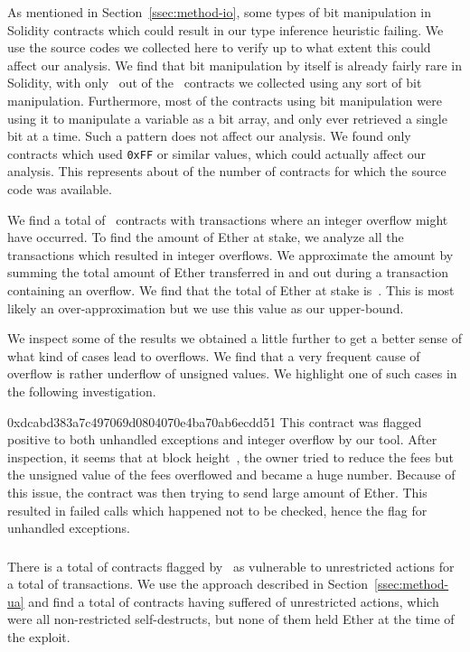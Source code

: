 As mentioned in Section~\ref{ssec:method-io}, some types of bit manipulation in Solidity contracts which could result in our type inference heuristic failing. We use the source codes we collected here to verify up to what extent this could affect our analysis. We find that bit manipulation by itself is already fairly rare in Solidity, with only~ out of the~ contracts we collected using any sort of bit manipulation. Furthermore, most of the contracts using bit manipulation were using it to manipulate a variable as a bit array, and only ever retrieved a single bit at a time. Such a pattern does not affect our analysis. We found only~ contracts which used \lstinline{0xFF} or similar values, which could actually affect our analysis. This represents about  of the number of contracts for which the source code was available.

We find a total of~ contracts with transactions where an integer overflow might have occurred.
To find the amount of Ether at stake, we analyze all the transactions which resulted in integer overflows. We approximate the amount by summing the total amount of Ether transferred in and out during a transaction containing an overflow. We find that the total of Ether at stake is~. This is most likely an over-approximation but we use this value as our upper-bound.

We inspect some of the results we obtained a little further to get a better sense of what kind of cases lead to overflows.
We find that a very frequent cause of overflow is rather underflow of unsigned values.
We highlight one of such cases in the following investigation.

\begin{investigation}{0xdcabd383a7c497069d0804070e4ba70ab6ecdd51}
This contract was flagged positive to both unhandled exceptions and integer overflow by our tool.
%
After inspection, it seems that at block height~, the owner tried to reduce the fees but the unsigned value of the fees overflowed and became a huge number. Because of this issue, the contract was then trying to send large amount of Ether. 
%
This resulted in failed calls which happened not to be checked, hence the flag for unhandled exceptions.
\end{investigation}

\subsubsection{\unrestrictedaction}
\label{ssec:analysis-ua}
There is a total of  contracts flagged by~\cite{Tsankov2018,Nikolic2018a,Krupp2018} as vulnerable to unrestricted actions for a total of  transactions. We use the approach described in Section~\ref{ssec:method-ua} and find a total of  contracts having suffered of unrestricted actions, which were all non-restricted self-destructs, but none of them held Ether at the time of the exploit.

